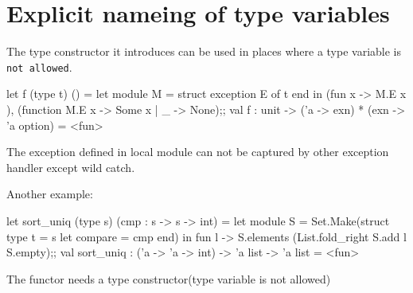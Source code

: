 \section{Explicit nameing of type variables}
\label{sec:expl-name-type}

The type constructor it introduces can be used in places where a type
variable is \verb|not allowed|.

\begin{redcode}
let f (type t) () = 
    let module M = struct exception E of t end in
    (fun x -> M.E x ), (function M.E x -> Some x | _ -> None);;
val f : unit -> ('a -> exn) * (exn -> 'a option) = <fun>  
\end{redcode}

The exception defined in local module can not be captured by other
exception handler except wild catch.

Another example:
\begin{redcode}
let sort_uniq (type s) (cmp : s -> s -> int) = 
    let module S = Set.Make(struct type t = s let compare = cmp end) in 
    fun l -> S.elements (List.fold_right S.add l S.empty);;
val sort_uniq : ('a -> 'a -> int) -> 'a list -> 'a list = <fun>  
\end{redcode}
The functor needs a type constructor(type variable is not allowed)
